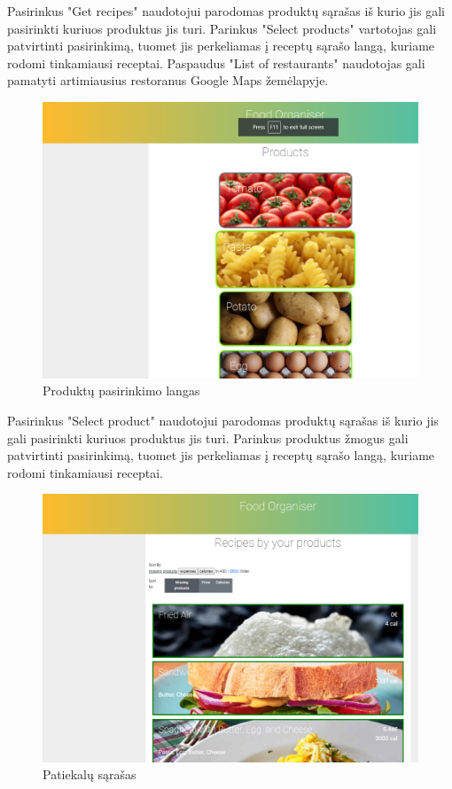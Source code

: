 \documentclass{VUMIFInfKursinis}
\begin{document}
Pasirinkus "Get recipes" naudotojui parodomas produktų sąrašas iš kurio jis gali pasirinkti kuriuos produktus jis turi. Parinkus "Select products" vartotojas gali patvirtinti pasirinkimą, tuomet jis perkeliamas į receptų sąrašo langą, kuriame rodomi tinkamiausi receptai. Paspaudus "List of restaurants" naudotojas gali pamatyti artimiausius restoranus Google Maps žemėlapyje.

\begin{figure}[H]
    \centering
 \includegraphics[scale=0.5]{img/selectProducts}
    \caption{Produktų pasirinkimo langas}   %
    \label{img:mlp}
\end{figure}
\bigskip

Pasirinkus "Select product" naudotojui parodomas produktų sąrašas iš kurio jis gali pasirinkti kuriuos produktus jis turi. Parinkus produktus žmogus gali patvirtinti pasirinkimą, tuomet jis perkeliamas  į receptų sąrašo langą, kuriame rodomi tinkamiausi receptai.

\begin{figure}[H]
    \centering
 \includegraphics[scale=0.5]{img/recipes}
    \caption{Patiekalų sąrašas}   %
    \label{img:mlp}
\end{figure}
\bigskip
\end{document}
